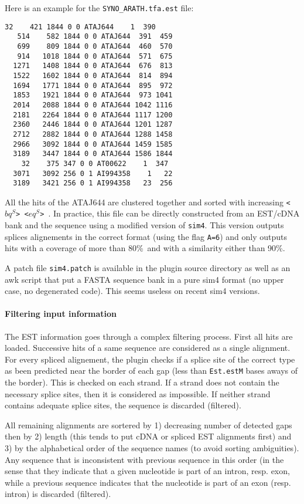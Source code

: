 Here is an example for the \texttt{SYNO\_ARATH.tfa.est} file:
\begin{Verbatim}[fontsize=\small]
    32    421 1844 0 0 ATAJ644    1  390
   514    582 1844 0 0 ATAJ644  391  459
   699    809 1844 0 0 ATAJ644  460  570
   914   1018 1844 0 0 ATAJ644  571  675
  1271   1408 1844 0 0 ATAJ644  676  813
  1522   1602 1844 0 0 ATAJ644  814  894
  1694   1771 1844 0 0 ATAJ644  895  972
  1853   1921 1844 0 0 ATAJ644  973 1041
  2014   2088 1844 0 0 ATAJ644 1042 1116
  2181   2264 1844 0 0 ATAJ644 1117 1200
  2360   2446 1844 0 0 ATAJ644 1201 1287
  2712   2882 1844 0 0 ATAJ644 1288 1458
  2966   3092 1844 0 0 ATAJ644 1459 1585
  3189   3447 1844 0 0 ATAJ644 1586 1844
    32    375 347 0 0 AT00622    1  347
  3071   3092 256 0 1 AI994358    1   22
  3189   3421 256 0 1 AI994358   23  256
\end{Verbatim}

All the hits of the ATAJ644 are clustered together and sorted with
increasing \texttt{<$bq^S$> <$eq^S$> }. In practice, this file can be
directly constructed from an EST/cDNA bank and the sequence using a
modified version of \texttt{sim4}. This version outputs splices
alignements in the correct format (using the flag \texttt{A=6}) and
only outputs hits with a coverage of more than 80\%\ and with a
similarity either than 90\%.

A patch file \texttt{sim4.patch} is available in the plugin source
directory as well as an awk script that put a FASTA sequence bank in a
pure sim4 format (no upper case, no degenerated code). This seems
useless on recent sim4 versions.

\paragraph{Filtering input information}

The EST information goes through a complex filtering process. First
all hits are loaded. Successive hits of a same sequence are considered
as a single alignment.  For every spliced alignement, the plugin
checks if a splice site of the correct type as been predicted near the
border of each gap (less than \texttt{Est.estM} bases aways of the
border). This is checked on each strand. If a strand does not contain
the necessary splice sites, then it is considered as impossible. If
neither strand contains adequate splice sites, the sequence is
discarded (filtered).

All remaining alignments are sortered by 1) decreasing number of
detected gaps then by 2) length (this tends to put cDNA or spliced EST
alignments first) and 3) by the alphabetical order of the sequence
names (to avoid sorting ambiguities). Any sequence that is
inconsistent with previous sequence in this order (in the sense that
they indicate that a given nucleotide is part of an intron, resp.
exon, while a previous sequence indicates that the nucleotide is part
of an exon (resp. intron) is discarded (filtered).

